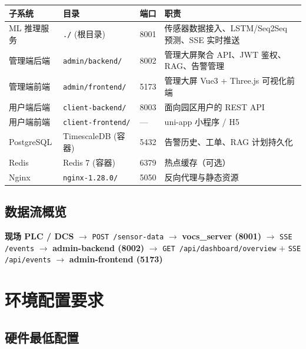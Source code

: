 \documentclass[UTF8,a4paper,11pt]{ctexart}
\begin{document}
\begin{longtable}{L{3.0cm} L{3.5cm} L{2.0cm} L{5.0cm}}
\toprule
\textbf{子系统} & \textbf{目录} & \textbf{端口} & \textbf{职责} \\
\midrule
\endhead
ML 推理服务      & \texttt{./} (根目录)              & 8001 & 传感器数据接入、LSTM/Seq2Seq 预测、SSE 实时推送 \\
管理端后端        & \texttt{admin/backend/}           & 8002 & 管理大屏聚合 API、JWT 鉴权、RAG、告警管理 \\
管理端前端        & \texttt{admin/frontend/}          & 5173 & 管理大屏 Vue3 + Three.js 可视化前端 \\
用户端后端        & \texttt{client-backend/}          & 8003 & 面向园区用户的 REST API \\
用户端前端        & \texttt{client-frontend/}         & ---  & uni-app 小程序 / H5 \\
PostgreSQL       & TimescaleDB (容器)                 & 5432 & 告警历史、工单、RAG 计划持久化 \\
Redis            & Redis 7 (容器)                     & 6379 & 热点缓存（可选） \\
Nginx            & \texttt{nginx-1.28.0/}            & 5050 & 反向代理与静态资源 \\
\bottomrule
\end{longtable}

\subsection{数据流概览}

\begin{infobox}[数据流]
\textbf{现场 PLC / DCS} $\longrightarrow$
\texttt{POST /sensor-data} $\longrightarrow$
\textbf{vocs\_server (8001)} $\longrightarrow$
\texttt{SSE /events} $\longrightarrow$
\textbf{admin-backend (8002)} $\longrightarrow$
\texttt{GET /api/dashboard/overview} $+$ \texttt{SSE /api/events} $\longrightarrow$
\textbf{admin-frontend (5173)}
\end{infobox}

\section{环境配置要求}

\subsection{硬件最低配置}
\end{document}
